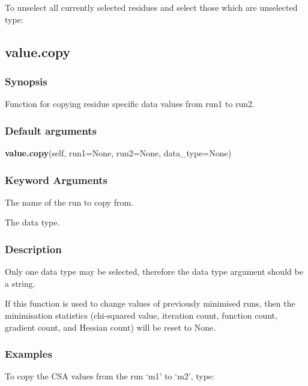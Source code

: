 To unselect all currently selected residues and select those which are unselected type:




\newpage

\subsection{value.copy}


\subsubsection{Synopsis}

Function for copying residue specific data values from run1 to run2.

\subsubsection{Default arguments}

\textsf{\textbf{value.copy}(self, run1=None, run2=None, data\_type=None)}


\subsubsection{Keyword Arguments}

  The name of the run to copy from.

  The data type.

\subsubsection{Description}

Only one data type may be selected, therefore the data type argument should be a string.

If this function is used to change values of previously minimised runs, then the
minimisation statistics (chi-squared value, iteration count, function count, gradient count,
and Hessian count) will be reset to None.


\subsubsection{Examples}

To copy the CSA values from the run `m1' to `m2', type:




